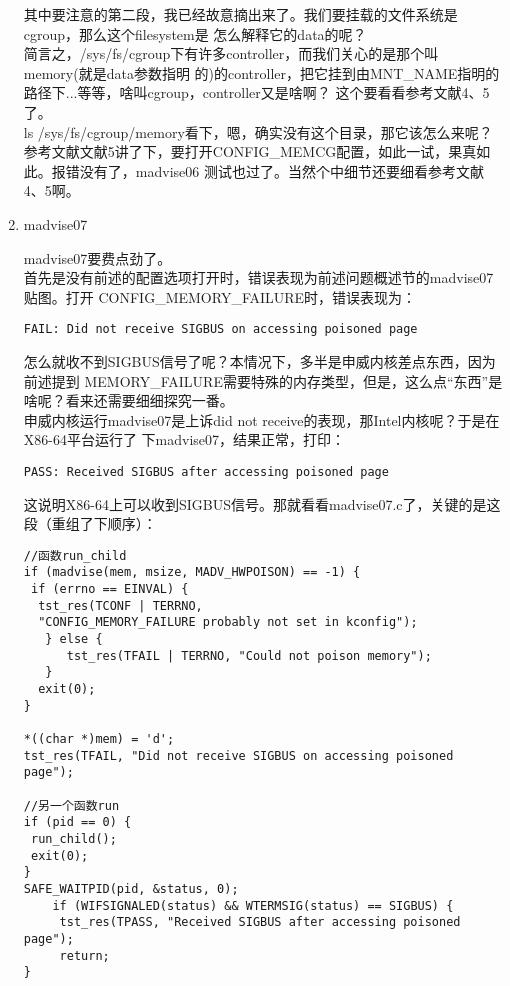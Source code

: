 \documentclass[scheme=plain]{ctexart}
\begin{document}
\begin{enumerate}
  其中要注意的第二段，我已经故意摘出来了。我们要挂载的文件系统是cgroup，那么这个filesystem是
  怎么解释它的data的呢？\\

  简言之，/sys/fs/cgroup下有许多controller，而我们关心的是那个叫memory(就是data参数指明
  的)的controller，把它挂到由MNT\_NAME指明的路径下...等等，啥叫cgroup，controller又是啥啊？
  这个要看看参考文献4、5了。\\

  ls /sys/fs/cgroup/memory看下，嗯，确实没有这个目录，那它该怎么来呢？\\

  参考文献文献5讲了下，要打开CONFIG\_MEMCG配置，如此一试，果真如此。报错没有了，madvise06
  测试也过了。当然个中细节还要细看参考文献4、5啊。
\item madvise07
  
  madvise07要费点劲了。\\

  首先是没有前述的配置选项打开时，错误表现为前述问题概述节的madvise07贴图。打开
  CONFIG\_MEMORY\_FAILURE时，错误表现为：
\begin{verbatim}
FAIL: Did not receive SIGBUS on accessing poisoned page
\end{verbatim}

  怎么就收不到SIGBUS信号了呢？本情况下，多半是申威内核差点东西，因为前述提到
  MEMORY\_FAILURE需要特殊的内存类型，但是，这么点“东西”是啥呢？看来还需要细细探究一番。\\

  申威内核运行madvise07是上诉did not receive的表现，那Intel内核呢？于是在X86-64平台运行了
  下madvise07，结果正常，打印：
\begin{verbatim}
PASS: Received SIGBUS after accessing poisoned page
\end{verbatim}

  这说明X86-64上可以收到SIGBUS信号。那就看看madvise07.c了，关键的是这段（重组了下顺序）：
\begin{verbatim}
//函数run_child
if (madvise(mem, msize, MADV_HWPOISON) == -1) {
 if (errno == EINVAL) {
  tst_res(TCONF | TERRNO,
  "CONFIG_MEMORY_FAILURE probably not set in kconfig");
   } else {
      tst_res(TFAIL | TERRNO, "Could not poison memory");
   }
  exit(0);
}

*((char *)mem) = 'd';
tst_res(TFAIL, "Did not receive SIGBUS on accessing poisoned page");

//另一个函数run
if (pid == 0) {
 run_child();
 exit(0);
}
SAFE_WAITPID(pid, &status, 0);
	if (WIFSIGNALED(status) && WTERMSIG(status) == SIGBUS) {
	 tst_res(TPASS, "Received SIGBUS after accessing poisoned page");
     return;
}
\end{verbatim}


\end{enumerate}
\end{document}
